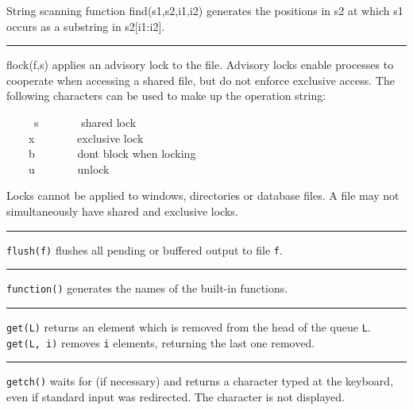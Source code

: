 \noindent
{}String scanning function find(s1,s2,i1,i2) generates
the positions in s2 at which s1 occurs as a substring in s2[i1:i2].

\bigskip\hrule\vspace{0.1cm}

\noindent
{}flock(f,s) applies an advisory
lock to the file. Advisory locks enable processes to
cooperate when accessing a shared file, but do not enforce exclusive
access. The following characters can be used to make up the operation
string: 

\ \ \ \ \ s \ \ \ \ \ \ \ shared lock\\
 \ \ \ \ x \ \ \ \ \ \ \ exclusive lock\\
 \ \ \ \ b \ \ \ \ \ \ \ don{\textquotesingle}t block when
locking\\
 \ \ \ \ u \ \ \ \ \ \ \ unlock 

Locks cannot be applied to windows, directories or database files. A
file may not simultaneously have shared and exclusive locks.

\bigskip\hrule\vspace{0.1cm}

\noindent
{}\texttt{flush(f)} flushes all pending or buffered output
to file \texttt{f}.

\bigskip\hrule\vspace{0.1cm}

\noindent
\texttt{function()} generates the names of the built-in functions.

\bigskip\hrule\vspace{0.1cm}

\noindent
\texttt{get(L)} returns an element which is removed from the head of the
queue \texttt{L}. \texttt{get(L, i)} removes \texttt{i}
elements, returning the last one removed.

\bigskip\hrule\vspace{0.1cm}

\noindent
\texttt{getch()} waits for (if necessary) and returns a character typed
at the keyboard, even if standard input was redirected.
The character is not displayed.

